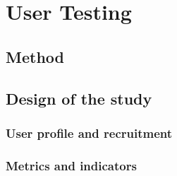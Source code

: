 
\section{User Testing}
\subsection{Method}
\subsection{Design of the study}
    \subsubsection{User profile and recruitment}
    \subsubsection{Metrics and indicators}
